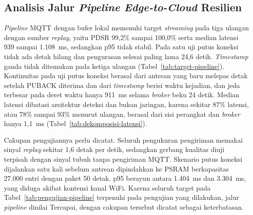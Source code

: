 \subsection{Analisis Jalur \textit{Pipeline Edge-to-Cloud} Resilien}

\textit{Pipeline} MQTT dengan bufer lokal memenuhi target \textit{streaming} pada tiga ulangan dengan sumber \textit{replay}, yaitu PDSR 99,2\% sampai 100,0\% serta median latensi 939 sampai 1.108~ms, sedangkan p95 tidak stabil. Pada satu uji putus koneksi tidak ada detak hilang dan pengurasan selesai paling lama 24,6 detik. \textit{Timestamp} ganda tidak ditemukan pada ketiga ulangan (Tabel~\ref{tab:target-pipeline}). Kontinuitas pada uji putus koneksi berasal dari antrean yang baru melepas detak setelah PUBACK diterima dan dari \textit{timestamp} berisi waktu kejadian, dan jeda terbesar pada deret waktu hanya 911~ms selama \textit{broker} beku 24 detik. Median latensi dibatasi arsitektur deteksi dan bukan jaringan, karena sekitar 87\% latensi, atau 78\% sampai 93\% menurut ulangan, berasal dari sisi perangkat dan \textit{broker} hanya 1,1~ms (Tabel~\ref{tab:dekomposisi-latensi}).

Cakupan pengujiannya perlu dicatat. Seluruh pengukuran pengiriman memakai sinyal \textit{replay} sekitar 1,6 detak per detik, sedangkan gerbang kualitas diuji terpisah dengan sinyal tubuh tanpa pengiriman MQTT. Skenario putus koneksi dijalankan satu kali sebelum antrean dipindahkan ke PSRAM berkapasitas 27.000 entri dengan paket 50 detak. p95 berayun antara 1.404~ms dan 3.304~ms, yang diduga akibat kontensi kanal WiFi. Karena seluruh target pada Tabel~\ref{tab:pengujian-pipeline} terpenuhi pada pengujian yang dilakukan, jalur \textit{pipeline} dinilai Tercapai, dengan cakupan tersebut dicatat sebagai keterbatasan.

